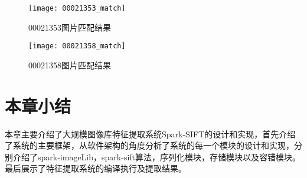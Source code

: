 \begin{figure}[htp]
\centering
\texttt{[image: 00021353\_match]}
\caption{00021353图片匹配结果}
\label{fig:00021353_match}
\end{figure}

\begin{figure}[htp]
\centering
\texttt{[image: 00021358\_match]}
\caption{00021358图片匹配结果}
\label{fig:00021358_match}
\end{figure}

\section{本章小结}
本章主要介绍了大规模图像库特征提取系统Spark-SIFT的设计和实现，首先介绍了系统的主要框架，从软件架构的角度分析了系统的每一个模块的设计和实现，分别介绍了spark-imageLib，spark-sift算法，序列化模块，存储模块以及容错模块。最后展示了特征提取系统的编译执行及提取结果。